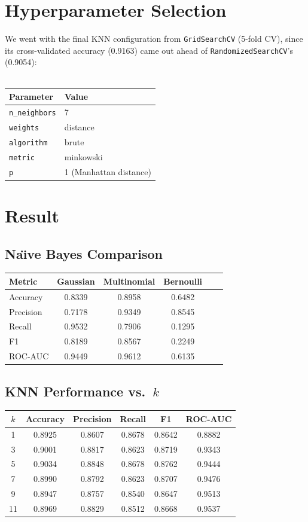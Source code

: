 \documentclass[12pt,a4paper]{article}
\begin{document}
\section{Hyperparameter Selection}

We went with the final KNN configuration from \texttt{GridSearchCV} (5-fold CV), since its cross-validated accuracy (0.9163) came out ahead of \texttt{RandomizedSearchCV}'s (0.9054):\\ \\
\begin{tabular}{ll}
\toprule
Parameter & Value\\
\midrule
\texttt{n\_neighbors} & 7 \\
\texttt{weights} & distance \\
\texttt{algorithm} & brute \\
\texttt{metric} & minkowski \\
\texttt{p} & 1 (Manhattan distance) \\
\bottomrule
\end{tabular}

\section{Result}

\subsection{Na\"{\i}ve Bayes Comparison}
\begin{tabular}{lccccc}
\toprule
Metric & Gaussian & Multinomial & Bernoulli \\
\midrule
Accuracy  & 0.8339 & 0.8958 & 0.6482 \\
Precision & 0.7178 & 0.9349 & 0.8545 \\
Recall    & 0.9532 & 0.7906 & 0.1295 \\
F1        & 0.8189 & 0.8567 & 0.2249 \\
ROC-AUC   & 0.9449 & 0.9612 & 0.6135 \\
\bottomrule
\end{tabular}

\subsection{KNN Performance vs.\ $k$}
\begin{tabular}{cccccc}
\toprule
$k$ & Accuracy & Precision & Recall & F1 & ROC-AUC\\
\midrule
1  & 0.8925 & 0.8607 & 0.8678 & 0.8642 & 0.8882 \\
3  & 0.9001 & 0.8817 & 0.8623 & 0.8719 & 0.9343 \\
5  & 0.9034 & 0.8848 & 0.8678 & 0.8762 & 0.9444 \\
7  & 0.8990 & 0.8792 & 0.8623 & 0.8707 & 0.9476 \\
9  & 0.8947 & 0.8757 & 0.8540 & 0.8647 & 0.9513 \\
11 & 0.8969 & 0.8829 & 0.8512 & 0.8668 & 0.9537 \\
\bottomrule
\end{tabular}
\end{document}
